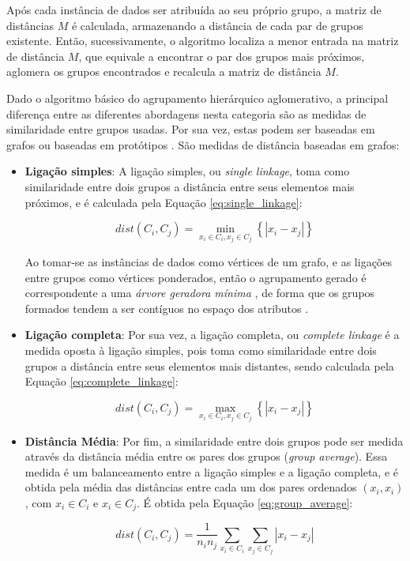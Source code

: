 Após cada instância de dados ser atribuída ao seu próprio grupo, a matriz de
distâncias $M$ é calculada, armazenando a distância de cada par de grupos
existente. Então, sucessivamente, o algoritmo localiza a menor entrada na matriz
de distância $M$, que equivale a encontrar o par dos grupos mais próximos,
aglomera os grupos encontrados e recalcula a matriz de distância $M$.

Dado o algoritmo básico do agrupamento hierárquico aglomerativo, a principal
diferença entre as diferentes abordagens nesta categoria são as medidas de 
similaridade entre grupos usadas. Por sua vez, estas podem ser baseadas em
grafos ou baseadas em protótipos \cite{tan2009introducao}. São medidas de
distância baseadas em grafos:

\begin{itemize}
	\item \textbf{Ligação simples}: A ligação simples, ou \emph{single linkage},
	toma como similaridade entre dois grupos a distância entre seus elementos 
	mais próximos, e é calculada pela Equação \ref{eq:single_linkage}:
	
	\begin{equation}
		dist\left(C_i,C_j\right) =
			\min_{x_i \in C_i , x_j \in C_j}
				{\left\{ \left| x_i - x_j \right| \right\}}
		\label{eq:single_linkage}
	\end{equation}
	
	
	Ao tomar-se as instâncias de dados como vértices de um grafo, e as ligações 
	entre grupos como vértices ponderados, então o agrupamento gerado é
	correspondente a uma \emph{árvore geradora mínima} \cite{han2011data}, de
	forma que os grupos formados tendem a ser contíguos no espaço dos atributos
	\cite{tan2009introducao}.
	
	\item \textbf{Ligação completa}: Por sua vez, a ligação completa, ou
	\emph{complete linkage} é a medida oposta à ligação simples, pois toma como 
	similaridade entre dois grupos a distância entre seus elementos mais
	distantes, sendo calculada pela Equação \ref{eq:complete_linkage}:
	
	\begin{equation}
		dist\left(C_i,C_j\right) =
			\max_{x_i \in C_i , x_j \in C_j}
				{\left\{ \left| x_i - x_j \right| \right\}}
		\label{eq:complete_linkage}
	\end{equation}
	
	
	\item \textbf{Distância Média}: Por fim, a similaridade entre dois grupos pode
	ser medida através da distância média entre os pares dos grupos
	(\emph{group average}). Essa medida é um balanceamento entre a ligação simples
	e a ligação completa, e é obtida pela média das distâncias entre cada um dos
	pares ordenados $(x_i,x_i)$, com $x_i \in C_i$ e $x_i \in C_j$. É obtida
	pela Equação \ref{eq:group_average}:
	
	\begin{equation}
		dist\left(C_i,C_j\right) =
			\frac{1}{n_in_j} 
			\sum_{x_i \in C_i}{
				\sum_{x_j \in C_j}{
					\left| x_i - x_j \right|
				}
			}
		\label{eq:group_average}
	\end{equation}
	
\end{itemize}

